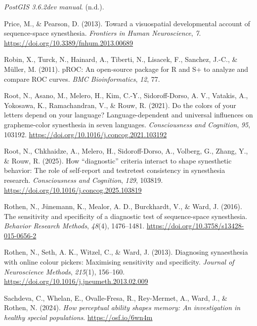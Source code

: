 \documentclass[
  man,
  longtable,
  a4paper,
  nolmodern,
  notxfonts,
  notimes,
  colorlinks=true,linkcolor=blue,citecolor=blue,urlcolor=blue]{apa7}
\newlength{\cslhangindent}
\newenvironment{CSLReferences}[2] %
 {\begin{list}{}{%
  \setlength{\itemindent}{0pt}
  \setlength{\leftmargin}{0pt}
  \setlength{\parsep}{0pt}
  \ifodd #1
   \setlength{\leftmargin}{\cslhangindent}
   \setlength{\itemindent}{-1\cslhangindent}
  \fi
  \setlength{\itemsep}{#2\baselineskip}}}
 {\end{list}}
\begin{document}
\begin{CSLReferences}{1}{0}
\emph{PostGIS 3.6.2dev manual}. (n.d.).

Price, M., \& Pearson, D. (2013). Toward a visuospatial developmental
account of sequence-space synesthesia. \emph{Frontiers in Human
Neuroscience}, \emph{7}. \url{https://doi.org/10.3389/fnhum.2013.00689}

Robin, X., Turck, N., Hainard, A., Tiberti, N., Lisacek, F., Sanchez,
J.-C., \& Müller, M. (2011). {pROC}: An open-source package for {R} and
{S}+ to analyze and compare ROC curves. \emph{BMC Bioinformatics},
\emph{12}, 77.

Root, N., Asano, M., Melero, H., Kim, C.-Y., Sidoroff-Dorso, A. V.,
Vatakis, A., Yokosawa, K., Ramachandran, V., \& Rouw, R. (2021). Do the
colors of your letters depend on your language? Language-dependent and
universal influences on grapheme-color synesthesia in seven languages.
\emph{Consciousness and Cognition}, \emph{95}, 103192.
\url{https://doi.org/10.1016/j.concog.2021.103192}

Root, N., Chkhaidze, A., Melero, H., Sidoroff-Dorso, A., Volberg, G.,
Zhang, Y., \& Rouw, R. (2025). How {``}diagnostic{''} criteria interact
to shape synesthetic behavior: The role of self-report and
test{\textendash}retest consistency in synesthesia research.
\emph{Consciousness and Cognition}, \emph{129}, 103819.
\url{https://doi.org/10.1016/j.concog.2025.103819}

Rothen, N., Jünemann, K., Mealor, A. D., Burckhardt, V., \& Ward, J.
(2016). The sensitivity and specificity of a diagnostic test of
sequence-space synesthesia. \emph{Behavior Research Methods},
\emph{48}(4), 1476--1481.
\url{https://doi.org/10.3758/s13428-015-0656-2}

Rothen, N., Seth, A. K., Witzel, C., \& Ward, J. (2013). Diagnosing
synaesthesia with online colour pickers: Maximising sensitivity and
specificity. \emph{Journal of Neuroscience Methods}, \emph{215}(1),
156--160. \url{https://doi.org/10.1016/j.jneumeth.2013.02.009}

Sachdeva, C., Whelan, E., Ovalle-Fresa, R., Rey-Mermet, A., Ward, J., \&
Rothen, N. (2024). \emph{How perceptual ability shapes memory: An
investigation in healthy special populations}.
\url{https://osf.io/6wn4m}


\end{CSLReferences}
\end{document}
